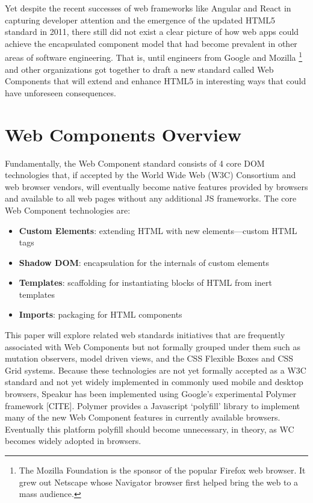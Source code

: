 Yet despite the recent successes of web frameworks like Angular and React in capturing developer attention and the emergence of the updated HTML5 standard in 2011, 
there still did not exist a clear picture of how web apps could achieve the encapsulated component model that had become prevalent in other areas of software engineering.
That is, until engineers from Google 
and Mozilla  \footnote{The Mozilla Foundation is the sponsor of the popular Firefox web browser. It grew out Netscape whose Navigator browser first helped bring the web to a mass audience.}
and other organizations got together to draft a new standard called Web Components that will extend and enhance HTML5 in interesting ways that could have unforeseen consequences.

\section{Web Components Overview}
Fundamentally, the Web Component standard consists of 4 core DOM technologies that, 
if accepted by the World Wide Web (W3C) 
Consortium and web browser vendors, 
will eventually become native features provided by browsers and available to all web pages without any additional JS frameworks. The core Web Component technologies are:
\begin{itemize}
\item
\textbf{Custom Elements}: extending HTML with new elements---custom HTML tags
\item
\textbf{Shadow DOM}: encapsulation for the internals of custom elements
\item
\textbf{Templates}: scaffolding for instantiating blocks of HTML from inert templates
\item
\textbf{Imports}: packaging for HTML components
\end{itemize}

This paper will explore related web standards initiatives that are frequently associated with Web Components 
but not formally grouped under them such as mutation observers,
model driven views, 
and the CSS Flexible Boxes
and CSS Grid
systems. 
Because these technologies are not yet formally accepted as a W3C standard and not yet widely implemented in commonly used mobile and desktop browsers, 
Speakur has been implemented using Google's experimental Polymer framework [CITE].
Polymer provides a Javascript `polyfill'
library to implement many of the new Web Component features in currently available browsers. 
Eventually this platform polyfill should become unnecessary, in theory, as WC becomes widely adopted in browsers.

